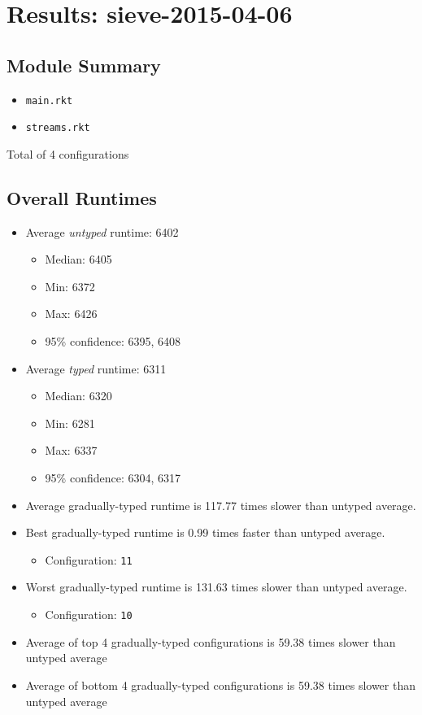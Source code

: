 \documentclass{article}
\newcommand{\mono}[1]{\texttt{#1}}
\begin{document}
\section{Results: sieve-2015-04-06}

\subsection{Module Summary}
\begin{itemize}
\item \mono{main.rkt}
\item \mono{streams.rkt}\end{itemize}
Total of 4 configurations

\subsection{Overall Runtimes}
\begin{itemize}
\item Average \emph{untyped} runtime: 6402
  \begin{itemize}
  \item Median: 6405
  \item Min: 6372
  \item Max: 6426
  \item 95\% confidence: 6395, 6408
  \end{itemize}
\item Average \emph{typed} runtime: 6311
  \begin{itemize}
  \item Median: 6320
  \item Min: 6281
  \item Max: 6337
  \item 95\% confidence: 6304, 6317
  \end{itemize}
\item Average gradually-typed runtime is 117.77 times slower than untyped average.
\item Best gradually-typed runtime is 0.99 times faster than untyped average.
\begin{itemize}\item Configuration: \mono{11}\end{itemize}
\item Worst gradually-typed runtime is 131.63 times slower than untyped average.
\begin{itemize}\item Configuration: \mono{10}\end{itemize}
\item Average of top 4 gradually-typed configurations is 59.38 times slower than untyped average
\item Average of bottom 4 gradually-typed configurations is 59.38 times slower than untyped average
\end{itemize}
\end{document}
